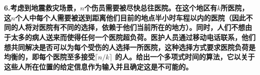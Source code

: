 
\chapter{}
\textbf{
6.考虑到地震救灾场景，$n$个伤员需要被尽快总往医院。在这个地区有$k$所医院，这$n$个人中每个人需要被送到距离他们目前的地点半小时车程以内的医院（因此不同的人将对医院有不同的选择，依赖于他们当前所在的地方）。同时，人们不想由于太多的病人送来而使得任何一个医院超负荷。医护人员通过移动电话联系，他们想共同解决是否可以为每个受伤的人选择一所医院，这种选择方式要求医院负荷是均衡的，即每个医院至多接受$\lceil n/k\rceil$ 的人。给出一个多项式时间的算法，它以关于这些人所在位置的给定信息作为输入并且确定这是不可能的。
}



